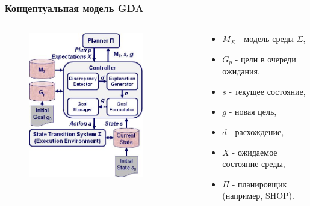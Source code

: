 \documentclass[default]{beamer}
\begin{document}
	\begin{frame}
		\frametitle{Концептуальная модель GDA}
		
		\begin{columns}
			\begin{column}{0.6\textwidth}
				\begin{figure}
					\includegraphics[width=0.8\textwidth]{gda_schema.jpg}
				\end{figure}
			\end{column}
			\begin{column}{0.4\textwidth}
					\begin{itemize}
						\item $M_\Sigma$ - модель среды $\Sigma$, 
						\item $G_p$ - цели в очереди ожидания,
						\item $s$ - текущее состояние,
						\item $g$ - новая цель,
						\item $d$ - расхождение,
						\item $X$ - ожидаемое состояние среды,
						\item $\Pi$ - планировщик (например, SHOP).
					\end{itemize}	
			\end{column}
		\end{columns}
	\end{frame}
\end{document}
